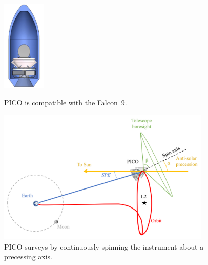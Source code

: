 \begin{figure}[!b]
  \begin{minipage}[b]{0.29\textwidth}
    \begin{center}
    \includegraphics[width=0.8in]{figures/InFairing.JPG}
\caption{\captiontext PICO is compatible with the Falcon~9.\label{fig:InFairing}}
    \end{center}
  \end{minipage}
%
\hfill
\begin{minipage}[b]{0.67\textwidth}
    \begin{center}
    \includegraphics[width=4in]{figures/MissionDesignFigure.png}
\caption{\captiontext 
  PICO surveys by continuously spinning the instrument about a
  precessing axis.\label{fig:MissionDesignFigure}}
   \end{center}
  \end{minipage}
 
\end{figure}






